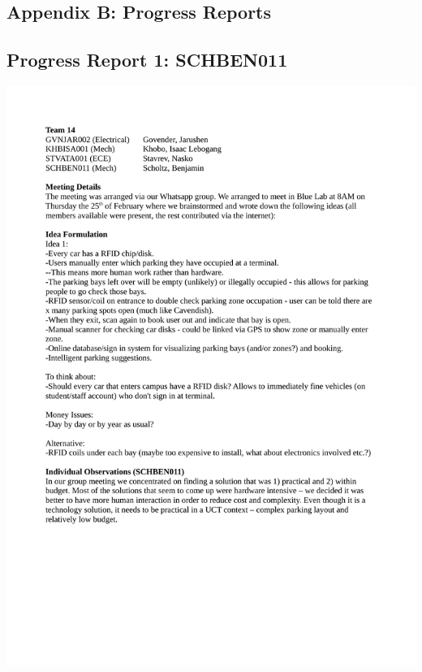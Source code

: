\newpage
\vspace*{\fill}
\begin{center}
\subsection*{Appendix B: Progress Reports}
\end{center}
\vspace*{\fill}

\newpage
\subsection*{Progress Report 1: SCHBEN011}
\includegraphics[scale=0.9]{meeting/report1-ben.pdf}

\newpage
